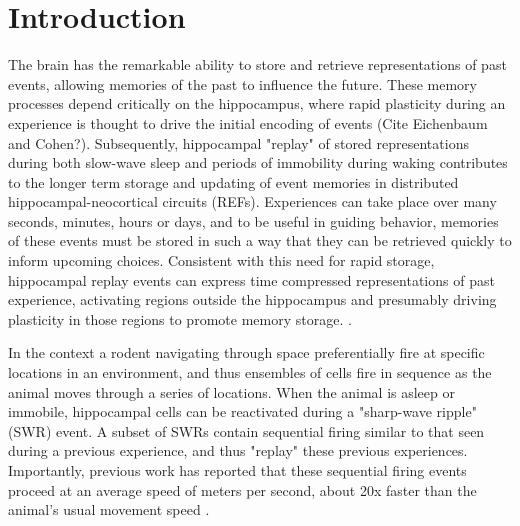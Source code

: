 \documentclass[9pt,lineno]{elife}
\begin{document}
\section*{Introduction}

The brain has the remarkable ability to store and retrieve representations of past events, allowing memories of the past to influence the future. These memory processes depend critically on the hippocampus, where rapid plasticity during an experience is thought to drive the initial encoding of events (Cite Eichenbaum and Cohen?). Subsequently, hippocampal "replay" of stored representations during both slow-wave sleep and periods of immobility during waking contributes to the longer term storage and updating of event memories in distributed hippocampal-neocortical circuits (REFs). Experiences can take place over many seconds, minutes, hours or days, and to be useful in guiding behavior, memories of these events must be stored in such a way that they can be retrieved quickly to inform upcoming choices. Consistent with this need for rapid storage, hippocampal replay events can express time compressed representations of past experience, activating regions outside the hippocampus and presumably driving plasticity in those regions to promote memory storage. \citep{CarrHippocampalreplayawake2011}. 

In the context a rodent navigating through space preferentially fire at specific locations in an environment, and thus ensembles of cells fire in sequence as the animal moves through a series of locations. When the animal is asleep or immobile, hippocampal cells can be reactivated during a "sharp-wave ripple" (SWR) event. A subset of SWRs contain sequential firing similar to that seen during a previous experience, and thus "replay" these previous experiences. Importantly, previous work has reported that these sequential firing events proceed at an average speed of  meters per second, about 20x faster than the animal's usual movement speed \citep{NadasdyReplayTimeCompression1999, LeeMemorySequentialExperience2002, DavidsonHippocampalReplayExtended2009, KarlssonAwakereplayremote2009}. 
\end{document}
